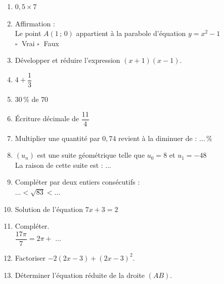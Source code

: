 \documentclass[a4paper,11pt,landscape,exos]{nsi} %
\begin{document}
\begin{multicols}{2}
\maketitle

\begin{enumerate}[itemsep=1em]
	\item $0{,}5\times7$
	\item Affirmation : \\
    Le point $A(1\,;\,0)$ appartient à la parabole d'équation $y=x^2-1$ \\	$\square\;$ Vrai \qquad $\square\;$ Faux\qquad 
	\item Développer et réduire l'expression $(x+1)(x-1)$.\\
	\item $4+\dfrac{1}{3}$ 
	\item $30\,\%$ de $70$
	\item Écriture décimale de   $\dfrac{11}{4}$ \\
	\item Multiplier une quantité par $0{,}74$ revient à la diminuer de : $\ldots\,\%$
	\item $(u_n)$ est une suite géométrique telle que $u_0=8$ et $u_1=-48$\\La raison de cette suite est :  $\ldots$
	\item Compléter par deux entiers consécutifs : \\$\ldots < \sqrt{83} < \ldots$
	\item Solution de l'équation $7x+3=2$\\
	\item Compléter.\\
      $\dfrac{17\pi}{7}=2\pi+$  $\ldots$
	\item  Factoriser   $-2(2x-3)+(2x-3)^2$.\\
	\item Déterminer l'équation réduite de la droite $(AB)$.\\    \begin{tikzpicture}[baseline,scale = 0.6]


\end{tikzpicture}
\end{enumerate}
\end{multicols}
\end{document}
